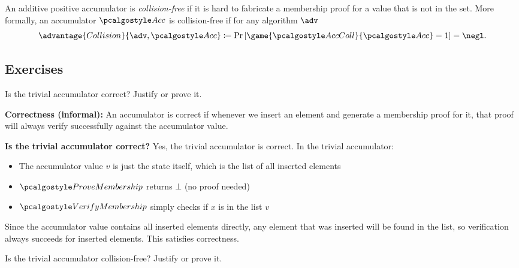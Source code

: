 \begin{definition}
    An additive positive accumulator is \emph{collision-free} if it is hard to fabricate a membership proof for a value that is not in the set.
    More formally, an accumulator $\algo{Acc}$ is collision-free if for any \ppt algorithm $\adv$
    \[
      \advantage{Collision}{\adv, \algo{Acc}} \defeq \pr{\game{\algo{AccColl}}{\algo{Acc}} = 1} = \negl.
    \]
\end{definition}

\subsection{Exercises}

\begin{exercise}
  Is the trivial accumulator correct?
  Justify or prove it.
\end{exercise}

\ifsolutions
\begin{mysolution}
  \textbf{Correctness (informal):} An accumulator is correct if whenever we insert an element and generate a membership proof for it, that proof will always verify successfully against the accumulator value.
  
  \textbf{Is the trivial accumulator correct?} Yes, the trivial accumulator is correct.
  In the trivial accumulator:
  \begin{itemize}
    \item The accumulator value $v$ is just the state itself, which is the list of all inserted elements
    \item $\algo{ProveMembership}$ returns $\bot$ (no proof needed)
    \item $\algo{VerifyMembership}$ simply checks if $x$ is in the list $v$
  \end{itemize}
  
  Since the accumulator value contains all inserted elements directly, any element that was inserted will be found in the list, so verification always succeeds for inserted elements.
  This satisfies correctness.
\end{mysolution}
\fi

\begin{exercise}
  Is the trivial accumulator collision-free?
  Justify or prove it.
\end{exercise}

